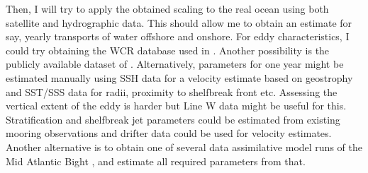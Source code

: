 Then, I will try to apply the obtained scaling to the real ocean using both satellite and hydrographic data. This should allow me to obtain an estimate for say, yearly transports of water offshore and onshore. For eddy characteristics, I could try obtaining the WCR database used in \cite{Chaudhuri2009}. Another possibility is the publicly available dataset of \cite{Chelton2011}. Alternatively, parameters for one year might be estimated manually using SSH data for a velocity estimate based on geostrophy and SST/SSS data for radii, proximity to shelfbreak front etc. Assessing the vertical extent of the eddy is harder but Line W data might be useful for this. Stratification and shelfbreak jet parameters could be estimated from existing mooring observations and drifter data could be used for velocity estimates. Another alternative is to obtain one of several data assimilative model runs of the Mid Atlantic Bight \cite[e.g.\ ][]{Chen2011}, and estimate all required parameters from that.  

